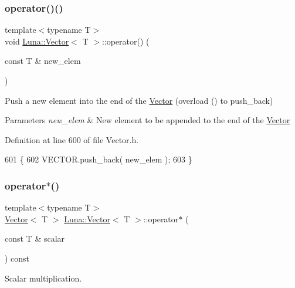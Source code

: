 \subsubsection{\texorpdfstring{operator()()}{operator()()}}
{\footnotesize\ttfamily template$<$typename T$>$ \\
void \hyperlink{classLuna_1_1Vector}{Luna\+::\+Vector}$<$ T $>$\+::operator() (\begin{DoxyParamCaption}\item[{const T \&}]{new\+\_\+elem }\end{DoxyParamCaption})\hspace{0.3cm}{\ttfamily [inline]}}



Push a new element into the end of the \hyperlink{classLuna_1_1Vector}{Vector} (overload () to push\+\_\+back) 


\begin{DoxyParams}{Parameters}
{\em new\+\_\+elem} & New element to be appended to the end of the \hyperlink{classLuna_1_1Vector}{Vector} \\
\hline
\end{DoxyParams}


Definition at line 600 of file Vector.\+h.


\begin{DoxyCode}
601   \{
602     VECTOR.push\_back( new\_elem );
603   \}
\end{DoxyCode}
\mbox{\label{classLuna_1_1Vector_a2d6abef72879a5ef40ce068271eb145f}} 
\subsubsection{\texorpdfstring{operator$\ast$()}{operator*()}}
{\footnotesize\ttfamily template$<$typename T$>$ \\
\hyperlink{classLuna_1_1Vector}{Vector}$<$ T $>$ \hyperlink{classLuna_1_1Vector}{Luna\+::\+Vector}$<$ T $>$\+::operator$\ast$ (\begin{DoxyParamCaption}\item[{const T \&}]{scalar }\end{DoxyParamCaption}) const\hspace{0.3cm}{\ttfamily [inline]}}



Scalar multiplication. 


